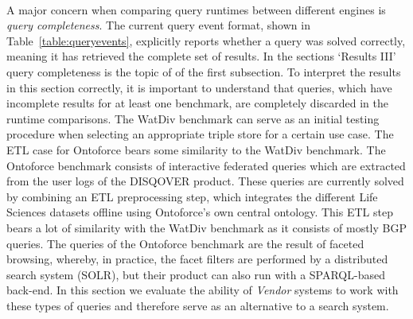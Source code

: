 
 \\
A major concern when comparing query runtimes between different engines is \emph{query completeness}. The current query event format, shown in Table~\ref{table:queryevents}, explicitly reports whether a query was solved correctly, meaning it has retrieved the complete set of results. In the sections `Results III' query completeness is the topic of of the first subsection.
To interpret the results in this section correctly, it is important to understand that queries, which have incomplete results for at least one benchmark, are completely discarded in the runtime comparisons.
The WatDiv benchmark can serve as an initial testing procedure when selecting an appropriate triple store for a certain use case. The ETL case for Ontoforce bears some similarity to the WatDiv benchmark. 
The Ontoforce benchmark consists of interactive federated queries which are extracted from the user logs of the DISQOVER product. These queries are currently solved by combining an ETL preprocessing step, which integrates the different Life Sciences datasets offline using Ontoforce's own central ontology. This ETL step bears a lot of similarity with the WatDiv benchmark as it consists of mostly BGP queries. The queries of the Ontoforce benchmark are the result of faceted browsing, whereby, in practice, the facet filters are performed by a distributed search system (SOLR), but their product can also run with a SPARQL-based back-end. In this section we evaluate the ability of \emph{Vendor} systems to work with these types of queries and therefore serve as an alternative to a search system.

